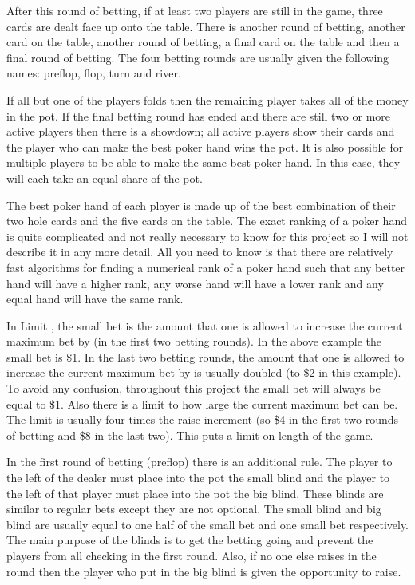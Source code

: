 After this round of betting, if at least two players are still in the game, three cards are dealt face up onto the table. There is another round of betting, another card on the table, another round of betting, a final card on the table and then a final round of betting. The four betting rounds are usually given the following names: preflop, flop, turn and river.

If all but one of the players folds then the remaining player takes all of the money in the pot. If the final betting round has ended and there are still two or more active players then there is a showdown; all active players show their cards and the player who can make the best poker hand wins the pot. It is also possible for multiple players to be able to make the same best poker hand. In this case, they will each take an equal share of the pot.

The best poker hand of each player is made up of the best combination of their two hole cards and the five cards on the table. The exact ranking of a poker hand is quite complicated and not really necessary to know for this project so I will not describe it in any more detail. All you need to know is that there are relatively fast algorithms for finding a numerical rank of a poker hand such that any better hand will have a higher rank, any worse hand will have a lower rank and any equal hand will have the same rank.

In Limit \texas, the small bet is the amount that one is allowed to increase the current maximum bet by (in the first two betting rounds). In the above example the small bet is \$1. In the last two betting rounds, the amount that one is allowed to increase the current maximum bet by is usually doubled (to \$2 in this example). To avoid any confusion, throughout this project the small bet will always be equal to \$1. Also there is a limit to how large the current maximum bet can be. The limit is usually four times the raise increment (so \$4 in the first two rounds of betting and \$8 in the last two). This puts a limit on length of the game. 

In the first round of betting (preflop) there is an additional rule. The player to the left of the dealer must place into the pot the small blind and the player to the left of that player must place into the pot the big blind. These blinds are similar to regular bets except they are not optional. The small blind and big blind are usually equal to one half of the small bet and one small bet respectively. The main purpose of the blinds is to get the betting going and prevent the players from all checking in the first round. Also, if no one else raises in the round then the player who put in the big blind is given the opportunity to raise.


